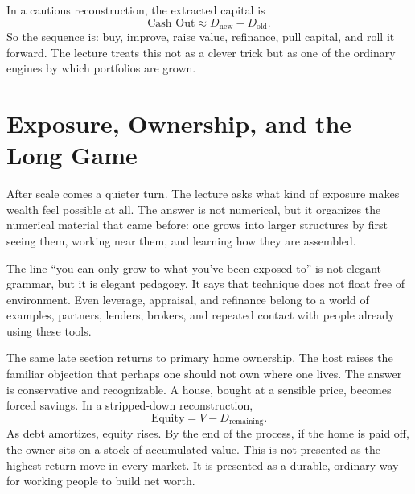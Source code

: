 \begin{figure}[h]
\centering
{}
\end{figure}

In a cautious reconstruction, the extracted capital is
\begin{equation}
\text{Cash Out} \approx D_{\text{new}} - D_{\text{old}}.
\end{equation}
So the sequence is: buy, improve, raise value, refinance, pull capital, and roll it forward. The lecture treats this not as a clever trick but as one of the ordinary engines by which portfolios are grown.

\section{Exposure, Ownership, and the Long Game}

After scale comes a quieter turn. The lecture asks what kind of exposure makes wealth feel possible at all. The answer is not numerical, but it organizes the numerical material that came before: one grows into larger structures by first seeing them, working near them, and learning how they are assembled.

The line ``you can only grow to what you've been exposed to'' is not elegant grammar, but it is elegant pedagogy. It says that technique does not float free of environment. Even leverage, appraisal, and refinance belong to a world of examples, partners, lenders, brokers, and repeated contact with people already using these tools.

The same late section returns to primary home ownership. The host raises the familiar objection that perhaps one should not own where one lives. The answer is conservative and recognizable. A house, bought at a sensible price, becomes forced savings. In a stripped-down reconstruction,
\begin{equation}
\text{Equity} = V - D_{\text{remaining}}.
\end{equation}
As debt amortizes, equity rises. By the end of the process, if the home is paid off, the owner sits on a stock of accumulated value. This is not presented as the highest-return move in every market. It is presented as a durable, ordinary way for working people to build net worth.

